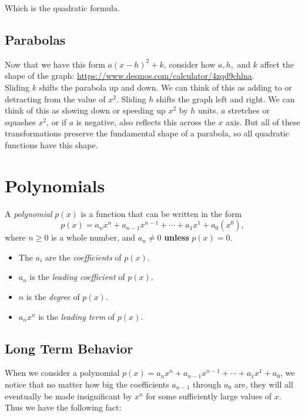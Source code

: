 Which is the quadratic formula.

\subsection{Parabolas}

Now that we have this form $a(x-h)^2+k$, consider how $a,h,$ and $k$  affect the shape of the graph: \url{https://www.desmos.com/calculator/4zqd9chlna}.\\

Sliding $k$ shifts the parabola up and down.  We can think of this as adding to or detracting from the value of $x^2$.  Sliding $h$ shifts the graph left and right.  We can think of this as slowing down or speeding up $x^2$ by $h$ units.  $a$ stretches or squashes $x^2$, or if $a$ is negative, also reflects this across the $x$ axis.  But all of these transformations preserve the fundamental shape of a parabola, so all quadratic functions have this shape.



\section{Polynomials}\label{Section:Polynomials}


\begin{definition}

A \textit{polynomial} $p(x)$ is a function that can be written in the form $$p(x)=a_nx^n+a_{n-1}x^{n-1}+\cdots+a_1x^1+a_0(x^0),$$ where $n\geq 0$ is a whole number, and $a_n\neq 0$ \textbf{unless} $p(x)=0$.

\begin{itemize}
\item The $a_i$ are the \textit{coefficients} of $p(x)$.
\item $a_n$ is the \textit{leading coefficient} of $p(x)$.
\item $n$ is the \textit{degree} of $p(x)$.
\item $a_nx^n$ is the \textit{leading term}  of $p(x)$.
\end{itemize}


\end{definition}

\subsection{Long Term Behavior}

When we consider a polynomial $p(x)=a_nx^n+a_{n-1}x^{n-1}+\cdots+a_1x^1+a_0$, we notice that no matter how big the coefficients $a_{n-1}$ through $a_0$ are, they will all eventually be made insignificant by $x^n$ for some sufficiently large values of $x$.  Thus we have the following fact:

